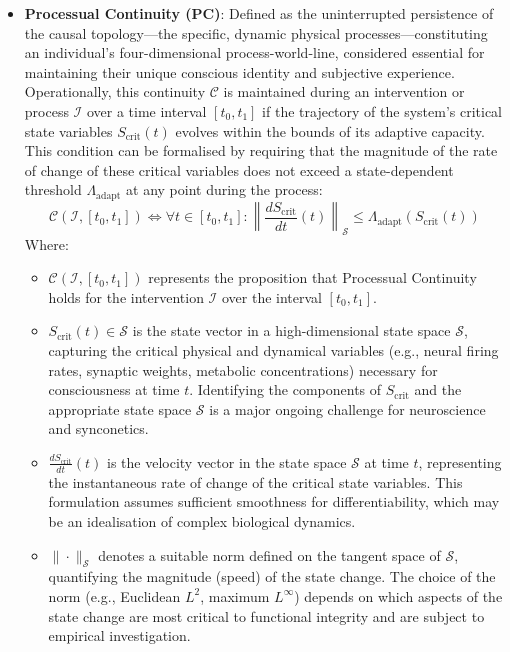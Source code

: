 \documentclass[10pt]{article}
\begin{document}
\begin{sloppypar}
\begin{itemize}
    \item \textbf{Processual Continuity (PC)}: Defined as the uninterrupted persistence of the causal topology—the specific, dynamic physical processes—constituting an individual’s four-dimensional process-world-line, considered essential for maintaining their unique conscious identity and subjective experience. Operationally, this continuity \( \mathcal{C} \) is maintained during an intervention or process \( \mathcal{I} \) over a time interval \( [t_0, t_1] \) if the trajectory of the system’s critical state variables \( S_{\text{crit}}(t) \) evolves within the bounds of its adaptive capacity. This condition can be formalised by requiring that the magnitude of the rate of change of these critical variables does not exceed a state-dependent threshold \( \Lambda_{\text{adapt}} \) at any point during the process:
          \begin{equation}
            \mathcal{C}(\mathcal{I}, [t_0, t_1]) \iff \forall t \in [t_0, t_1] : \left\| \frac{dS_{\text{crit}}}{dt}(t) \right\|_{\mathcal{S}} \le \Lambda_{\text{adapt}}(S_{\text{crit}}(t))
            \label{eq:continuity}
          \end{equation}
          Where:
          \begin{itemize}
            \item \( \mathcal{C}(\mathcal{I}, [t_0, t_1]) \) represents the proposition that Processual Continuity holds for the intervention \( \mathcal{I} \) over the interval \( [t_0, t_1] \).
            \item \( S_{\text{crit}}(t) \in \mathcal{S} \) is the state vector in a high-dimensional state space \( \mathcal{S} \), capturing the critical physical and dynamical variables (e.g., neural firing rates, synaptic weights, metabolic concentrations) necessary for consciousness at time \( t \). Identifying the components of \( S_{\text{crit}} \) and the appropriate state space \( \mathcal{S} \) is a major ongoing challenge for neuroscience and synconetics.
            \item \( \frac{dS_{\text{crit}}}{dt}(t) \) is the velocity vector in the state space \( \mathcal{S} \) at time \( t \), representing the instantaneous rate of change of the critical state variables. This formulation assumes sufficient smoothness for differentiability, which may be an idealisation of complex biological dynamics.
            \item \( \| \cdot \|_{\mathcal{S}} \) denotes a suitable norm defined on the tangent space of \( \mathcal{S} \), quantifying the magnitude (speed) of the state change. The choice of the norm (e.g., Euclidean \( L^2 \), maximum \( L^\infty \)) depends on which aspects of the state change are most critical to functional integrity and are subject to empirical investigation.

\end{itemize}
\end{itemize}
\end{sloppypar}
\end{document}
